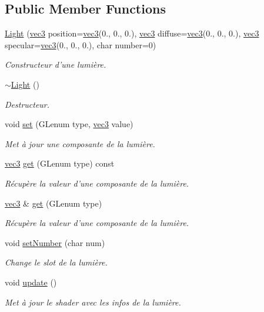 \subsection*{Public Member Functions}
\begin{DoxyCompactItemize}
\item 
\hyperlink{class_light_a661826269046b9f5d0e7eb8415e6fd12}{Light} (\hyperlink{structvec3}{vec3} position=\hyperlink{structvec3}{vec3}(0., 0., 0.), \hyperlink{structvec3}{vec3} diffuse=\hyperlink{structvec3}{vec3}(0., 0., 0.), \hyperlink{structvec3}{vec3} specular=\hyperlink{structvec3}{vec3}(0., 0., 0.), char number=0)
\begin{DoxyCompactList}\small\item\em Constructeur d'une lumière. \end{DoxyCompactList}\item 
\hyperlink{class_light_ad0e59fad13bb6cfadc25b2c477e9ddc7}{$\sim$\+Light} ()
\begin{DoxyCompactList}\small\item\em Destructeur. \end{DoxyCompactList}\item 
void \hyperlink{class_light_a9fcc4b3ffdeedbe214ee8384c7d311b9}{set} (G\+Lenum type, \hyperlink{structvec3}{vec3} value)
\begin{DoxyCompactList}\small\item\em Met à jour une composante de la lumière. \end{DoxyCompactList}\item 
\hyperlink{structvec3}{vec3} \hyperlink{class_light_ad0f5f939bc047e39c6deb2e264a5a2c1}{get} (G\+Lenum type) const 
\begin{DoxyCompactList}\small\item\em Récupère la valeur d'une composante de la lumière. \end{DoxyCompactList}\item 
\hyperlink{structvec3}{vec3} \& \hyperlink{class_light_a74a0381255c1c7e002ac583401a46de0}{get} (G\+Lenum type)
\begin{DoxyCompactList}\small\item\em Récupère la valeur d'une composante de la lumière. \end{DoxyCompactList}\item 
void \hyperlink{class_light_a985e67a0b88ba49ec8da5d5b205d06ed}{set\+Number} (char num)
\begin{DoxyCompactList}\small\item\em Change le slot de la lumière. \end{DoxyCompactList}\item 
void \hyperlink{class_light_a295eaf1ef5ebd30fa4997d4f7ccbb7e1}{update} ()
\begin{DoxyCompactList}\small\item\em Met à jour le shader avec les infos de la lumière. \end{DoxyCompactList}\end{DoxyCompactItemize}
